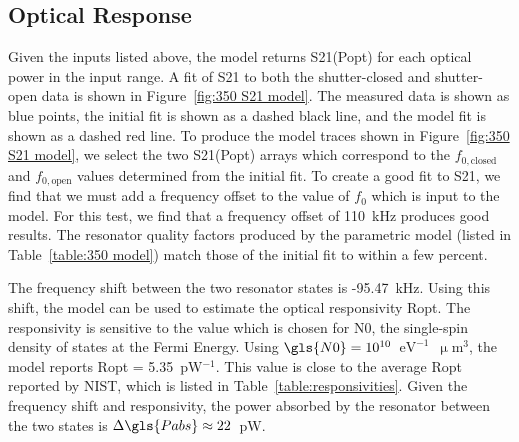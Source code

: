 \subsection{Optical Response}

Given the inputs listed above, the model returns \gls{S21}(\gls{Popt}) for each optical power in the input range. A fit of \gls{S21} to both the shutter-closed and shutter-open data is shown in Figure~\ref{fig:350 S21 model}. The measured data is shown as blue points, the initial fit is shown as a dashed black line, and the model fit is shown as a dashed red line. To produce the model traces shown in Figure~\ref{fig:350 S21 model}, we select the two \gls{S21}(\gls{Popt}) arrays which correspond to the $f_{0,\mathrm{closed}}$ and $f_{0,\mathrm{open}}$ values determined from the initial fit. To create a good fit to \gls{S21}, we find that we must add a frequency offset to the value of $f_{0}$ which is input to the model. For this test, we find that a frequency offset of 110~kHz produces good results. The resonator quality factors produced by the parametric model (listed in Table~\ref{table:350 model}) match those of the initial fit to within a few percent.

The frequency shift between the two resonator states is -95.47~kHz. Using this shift, the model can be used to estimate the optical responsivity \gls{Ropt}. The responsivity is sensitive to the value which is chosen for \gls{N0}, the single-spin density of states at the Fermi Energy. Using $\gls{N0} = 10^{10}$~$\mathrm{eV}^{-1}$~$\upmu$m$^{3}$, the model reports \gls{Ropt} = 5.35~pW$^{-1}$. This value is close to the average \gls{Ropt} reported by NIST, which is listed in Table~\ref{table:responsivities}. Given the frequency shift and responsivity, the power absorbed by the resonator between the two states is $\Delta \gls{Pabs} \approx 22$~pW.

